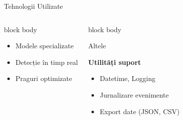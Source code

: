 \documentclass[aspectratio=169,9pt]{beamer}
\begin{document}
\begin{frame}{Tehnologii Utilizate}
\begin{columns}[T]
\begin{beamercolorbox}[rounded=true,shadow=true,sep=0.7em]{block body}
\begin{center}
                                        \footnotesize
                                        \begin{itemize}[leftmargin=*]
                                                \setlength{\itemsep}{0pt}
                                                \item Modele specializate
                                                \item Detecție în timp real
                                                \item Praguri optimizate
                                        \end{itemize}
                                \end{center}
                        \end{beamercolorbox}
                        
                        \vspace{0.3cm}
                        
                        \begin{beamercolorbox}[rounded=true,shadow=true,sep=0.7em]{block body}
                                \begin{center}
                                        {\fontsize{18}{18}\selectfont\textcolor{mainblue}{Altele}}
                                        \vspace{0.1cm}
                                        
                                        \textbf{\small Utilități suport}
                                        \vspace{0.1cm}
                                        
                                        \footnotesize
                                        \begin{itemize}[leftmargin=*]
                                            \setlength{\itemsep}{0pt}
                                            \item Datetime, Logging
                                            \item Jurnalizare evenimente
                                            \item Export date (JSON, CSV)
                                        \end{itemize}
                                \end{center}
                        \end{beamercolorbox}
        \end{columns}
\end{frame}
\end{document}

